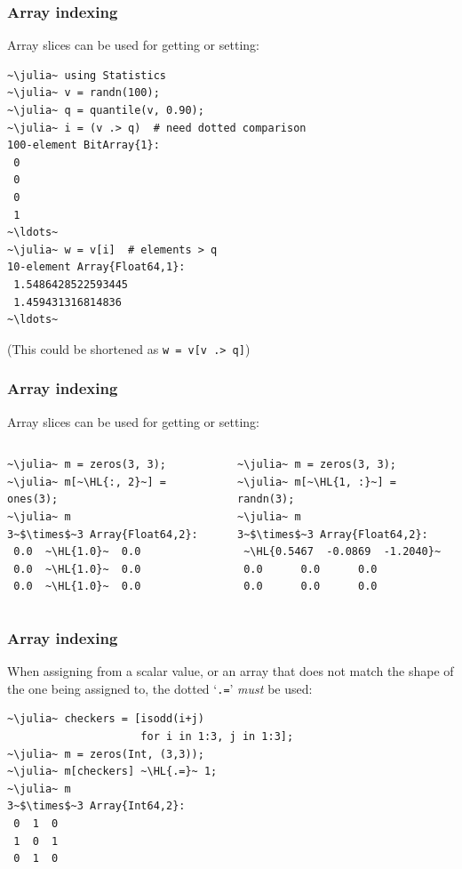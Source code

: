 \documentclass[english,serif,mathserif,xcolor=pdftex,dvipsnames,table]{beamer}
\begin{document}
\begin{frame}
  \frametitle{Array indexing}
  \smaller
  Array slices can be used for getting or setting:
\begin{lstlisting}
~\julia~ using Statistics
~\julia~ v = randn(100);
~\julia~ q = quantile(v, 0.90);
~\julia~ i = (v .> q)  # need dotted comparison
100-element BitArray{1}:
 0
 0
 0
 1
~\ldots~
~\julia~ w = v[i]  # elements > q
10-element Array{Float64,1}:
 1.5486428522593445
 1.459431316814836
~\ldots~
\end{lstlisting}
  (This could be shortened as \texttt{w = v[v .> q]})
\end{frame}


\begin{frame}[fragile]
  \frametitle{Array indexing}
  Array slices can be used for getting or setting:
  \begin{columns}
    \begin{column}{0.6\textwidth}
\begin{lstlisting}
~\julia~ m = zeros(3, 3);
~\julia~ m[~\HL{:, 2}~] = ones(3);
~\julia~ m
3~$\times$~3 Array{Float64,2}:
 0.0  ~\HL{1.0}~  0.0
 0.0  ~\HL{1.0}~  0.0
 0.0  ~\HL{1.0}~  0.0
\end{lstlisting}
    \end{column}
    \begin{column}{0.6\textwidth}
\begin{lstlisting}
~\julia~ m = zeros(3, 3);
~\julia~ m[~\HL{1, :}~] = randn(3);
~\julia~ m
3~$\times$~3 Array{Float64,2}:
 ~\HL{0.5467  -0.0869  -1.2040}~
 0.0      0.0      0.0
 0.0      0.0      0.0
\end{lstlisting}
    \end{column}
  \end{columns}
\end{frame}


\begin{frame}[fragile]
  \frametitle{Array indexing}
  When assigning from a scalar value, or an array that does not match
  the shape of the one being assigned to, the dotted `\texttt{.=}'
  \emph{must} be used:
\begin{lstlisting}
~\julia~ checkers = [isodd(i+j)
                     for i in 1:3, j in 1:3];
~\julia~ m = zeros(Int, (3,3));
~\julia~ m[checkers] ~\HL{.=}~ 1;
~\julia~ m
3~$\times$~3 Array{Int64,2}:
 0  1  0
 1  0  1
 0  1  0
\end{lstlisting}
\end{frame}
\end{document}
